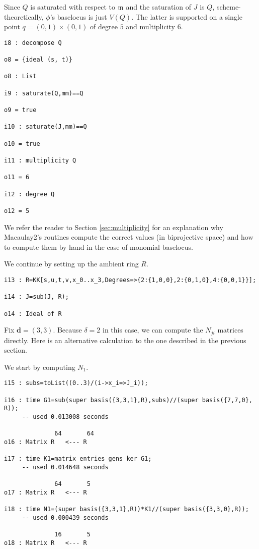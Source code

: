\documentclass[fleqn,reqno]{amsart}
\numberwithin{first}{chapter}
\begin{document}
Since $Q$ is saturated with respect to $\mathfrak{m}$ and the saturation of $J$ is $Q$,
scheme-theoretically, $\phi$'s baselocus is just $V(Q)$.
The latter is supported on a single point $q=(0,1)\times(0,1)$
of degree $5$ and multiplicity $6$.

\begin{verbatim}
i8 : decompose Q

o8 = {ideal (s, t)}

o8 : List

i9 : saturate(Q,mm)==Q

o9 = true

i10 : saturate(J,mm)==Q

o10 = true

i11 : multiplicity Q

o11 = 6

i12 : degree Q

o12 = 5

\end{verbatim}

We refer the reader to Section \ref{sec:multiplicity} for an explanation why
Macaulay2's routines compute the correct values (in biprojective space) and
how to compute them by hand in the case of monomial baselocus.

We continue by setting up the ambient ring $R$.

\begin{verbatim}
i13 : R=KK[s,u,t,v,x_0..x_3,Degrees=>{2:{1,0,0},2:{0,1,0},4:{0,0,1}}];

i14 : J=sub(J, R);

o14 : Ideal of R

\end{verbatim}

Fix $\mathbf d=(3,3)$.
Because $\delta=2$ in this case, we can compute the $N_{ji}$ matrices directly.
Here is an alternative calculation to the one described in the previous section.

We start by computing $N_1$.

\begin{verbatim}
i15 : subs=toList((0..3)/(i->x_i=>J_i));

i16 : time G1=sub(super basis({3,3,1},R),subs)//(super basis({7,7,0}, R));
     -- used 0.013008 seconds

              64       64
o16 : Matrix R   <--- R

i17 : time K1=matrix entries gens ker G1;
     -- used 0.014648 seconds

              64       5
o17 : Matrix R   <--- R

i18 : time N1=(super basis({3,3,1},R))*K1//(super basis({3,3,0},R));
     -- used 0.000439 seconds

              16       5
o18 : Matrix R   <--- R

\end{verbatim}
\end{document}
